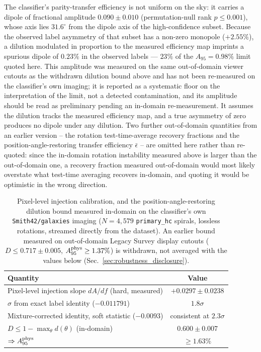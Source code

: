 \documentclass[twocolumn,linenumbers]{aastex702}
\begin{document}
The classifier's parity-transfer efficiency is not uniform on the sky: it
carries a dipole of fractional amplitude $0.090 \pm 0.010$
(permutation-null rank $p \le 0.001$), whose axis lies $31.6^\circ$ from
the dipole axis of the high-confidence subset. Because the observed label
asymmetry of that subset has a non-zero monopole ($+2.55\%$), a dilution
modulated in proportion to the measured efficiency map imprints a spurious
dipole of $0.23\%$ in the observed labels --- $23\%$ of the
$A_{95} = 0.98\%$ limit quoted here. This amplitude was measured on the
same out-of-domain viewer cutouts as the withdrawn dilution bound above
and has not been re-measured on the classifier's own imaging; it is
reported as a systematic floor on the interpretation of the limit, not a
detected contamination, and its amplitude should be read as preliminary
pending an in-domain re-measurement. It assumes the dilution tracks the
measured efficiency map, and a true asymmetry of zero produces no dipole
under any dilution. Two further out-of-domain quantities from an earlier
version -- the rotation test-time-average recovery fractions and the
position-angle-restoring transfer efficiency $\bar\epsilon$ -- are omitted
here rather than re-quoted: since the in-domain rotation instability
measured above is larger than the out-of-domain one, a recovery fraction
measured out-of-domain would most likely overstate what test-time
averaging recovers in-domain, and quoting it would be optimistic in the
wrong direction.

\begin{table}[t]
\centering
\caption{Pixel-level injection calibration, and the position-angle-restoring
dilution bound measured in-domain on the classifier's own
\texttt{Smith42/galaxies} imaging ($N=4{,}579$ \texttt{primary\_hc}
spirals, lossless rotations, streamed directly from the dataset). An
earlier bound measured on out-of-domain Legacy Survey display cutouts
($D \le 0.717 \pm 0.005$, $A_{95}^{\rm phys} \ge 1.37\%$) is withdrawn,
not averaged with the values below (Sec.~\ref{sec:robustness_disclosure}).}
\label{tab:pixel_calib}
\begin{ruledtabular}
\begin{tabular}{lc}
Quantity & Value \\
\hline
Pixel-level injection slope $dA/df$ (hard, measured) & $+0.0297\pm0.0238$ \\
$\sigma$ from exact label identity ($-0.011791$) & $1.8\sigma$ \\
Mixture-corrected identity, soft statistic ($-0.0093$) & consistent at $2.3\sigma$ \\
$D \le 1-\max_\theta d(\theta)$ (in-domain) & $0.600\pm0.007$ \\
$\Rightarrow A_{95}^{\rm phys}$ & $\ge 1.63\%$ \\
\end{tabular}
\end{ruledtabular}
\end{table}
\end{document}
